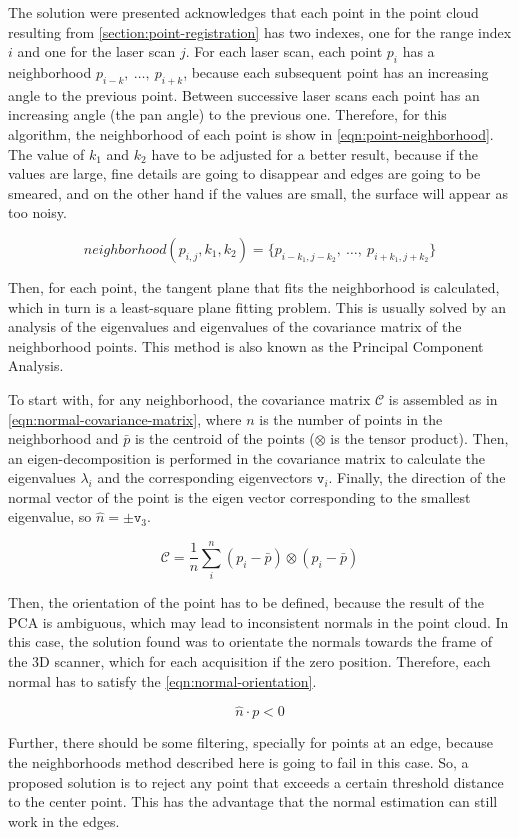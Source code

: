 The solution were presented acknowledges that each point in the point cloud resulting from \cref{section:point-registration} has two indexes, one for the range index $i$ and one for the laser scan $j$. For each laser scan, each point $p_i$ has a neighborhood ${p_{i-k}, \ \dots, \ p_{i+k}}$, because each subsequent point has an increasing angle to the previous point. Between successive laser scans each point has an increasing angle (the pan angle) to the previous one. Therefore, for this algorithm, the neighborhood of each point is show in \cref{eqn:point-neighborhood}. The value of $k_1$ and $k_2$ have to be adjusted for a better result, because if the values are large, fine details are going to disappear and edges are going to be smeared, and on the other hand if the values are small, the surface will appear as too noisy.

\begin{equation}
\label{eqn:point-neighborhood}
    neighborhood(p_{i,j}, k_1, k_2) = \{p_{i-k_1, j-k_2}, \ \dots, \ p_{i+k_1, j+k_2}\}
\end{equation}

Then, for each point, the tangent plane that fits the neighborhood is calculated, which in turn is a least-square plane fitting problem. This is usually solved by an analysis of the eigenvalues and eigenvalues of the covariance matrix of the neighborhood points. This method is also known as the Principal Component Analysis.

To start with, for any neighborhood, the covariance matrix $\mathcal{C}$ is assembled as in \cref{eqn:normal-covariance-matrix}, where $n$ is the number of points in the neighborhood and $\bar{p}$ is the centroid of the points ($\otimes$ is the  tensor product). Then, an eigen-decomposition is performed in the covariance matrix to calculate the eigenvalues $\lambda_i$ and the corresponding eigenvectors $\texttt{v}_i$. Finally, the direction of the normal vector of the point is the eigen vector corresponding to the smallest eigenvalue, so $\hat{n} = \pm \texttt{v}_3$.

\begin{equation}
\label{eqn:normal-covariance-matrix}
    \mathcal{C} = \frac{1}{n} \sum_{i}^{n}{(p_i - \bar{p}) \otimes (p_i - \bar{p})}
\end{equation}

Then, the orientation of the point has to be defined, because the result of the PCA is ambiguous, which may lead to inconsistent normals in the point cloud. In this case, the solution found was to orientate the normals towards the frame of the 3D scanner, which for each acquisition if the zero position.     Therefore, each normal has to satisfy the \cref{eqn:normal-orientation}.

\begin{equation}
\label{eqn:normal-orientation}
    \hat{n} \cdot p < 0
\end{equation}

Further, there should be some filtering, specially for points at an edge, because the neighborhoods method described here is going to fail in this case. So, a proposed solution is to reject any point that exceeds a certain threshold distance to the center point. This has the advantage that the normal estimation can still work in the edges.